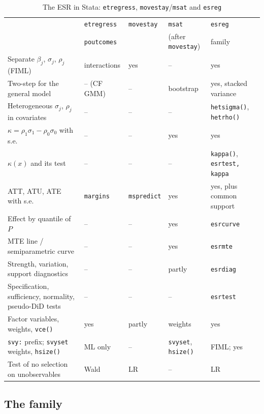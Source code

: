 \documentclass[11pt,a4paper]{article}
\theoremstyle{plain}
\theoremstyle{definition}
\theoremstyle{remark}
\newcommand{\1}{\mathbf{1}}
\newcommand{\cmd}[1]{\texttt{#1}}
\newcommand{\kX}{\kappa(x)}
\begin{document}
\begin{table}[t]
\centering
\caption{The ESR in Stata: \cmd{etregress}, \cmd{movestay}/\cmd{msat} and \cmd{esreg}}
\label{tab:cmds}
\footnotesize
\begin{tabular}{@{}L{5.0cm}L{2.1cm}L{1.6cm}L{2.1cm}L{3.3cm}@{}}
\toprule
 & \cmd{etregress} & \cmd{movestay} & \cmd{msat} & \cmd{esreg} \\
 & \cmd{poutcomes} & & (after \cmd{movestay}) & family \\
\midrule
Separate $\beta_j$, $\sigma_j$, $\rho_j$ (FIML) & interactions & yes & -- & yes \\
Two-step for the general model & -- (CF GMM) & -- & bootstrap & yes, stacked variance \\
Heterogeneous $\sigma_j$, $\rho_j$ in covariates & -- & -- & -- & \cmd{hetsigma()}, \cmd{hetrho()} \\
$\kappa=\rho_1\sigma_1-\rho_0\sigma_0$ with s.e. & -- & -- & yes & yes \\
$\kX$ and its test & -- & -- & -- & \cmd{kappa()}, \cmd{esrtest, kappa} \\
ATT, ATU, ATE with s.e. & \cmd{margins} & \cmd{mspredict} & yes & yes, plus common support \\
Effect by quantile of $P$ & -- & -- & yes & \cmd{esrcurve} \\
MTE line / semiparametric curve & -- & -- & yes & \cmd{esrmte} \\
Strength, variation, support diagnostics & -- & -- & partly & \cmd{esrdiag} \\
Specification, sufficiency, normality, pseudo-DiD tests & -- & -- & -- & \cmd{esrtest} \\
Factor variables, weights, \cmd{vce()} & yes & partly & weights & yes \\
\cmd{svy:} prefix; \cmd{svyset} weights, \cmd{hsize()} & ML only & -- & \cmd{svyset}, \cmd{hsize()} & FIML; yes \\
Test of no selection on unobservables & Wald & LR & -- & LR \\
\bottomrule
\end{tabular}
\end{table}

\subsection{The family}\label{sec:cmd:family}
\end{document}
